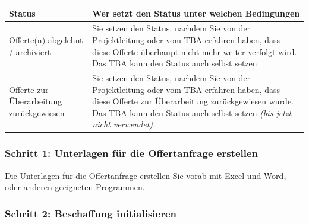 \vspace{\baselineskip}

\begin{tabular}{|p{5cm}|p{9.5cm}|}    %
\hline
\textbf{Status} & \textbf{Wer setzt den Status unter welchen Bedingungen} \\
\hline
Offerte(n) abgelehnt / archiviert & Sie setzen den Status, nachdem Sie von der Projektleitung oder vom TBA erfahren haben, dass diese Offerte
überhaupt nicht mehr weiter verfolgt wird. Das TBA kann den Status auch selbst setzen. \\
\hline
Offerte zur Überarbeitung zurückgewiesen & Sie setzen den Status, nachdem Sie von der Projektleitung oder vom TBA erfahren haben, dass diese Offerte zur
Überarbeitung zurückgewiesen wurde. Das TBA kann den Status auch selbst setzen \textit{(bis jetzt nicht
verwendet).} \\
\hline
\end{tabular}

\subsubsection{Schritt 1: Unterlagen für die Offertanfrage erstellen}

Die Unterlagen für die Offertanfrage erstellen Sie vorab mit Excel und Word, oder anderen geeigneten Programmen.

\subsubsection{Schritt 2: Beschaffung initialisieren}

